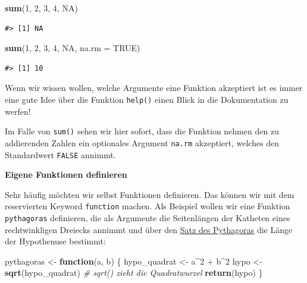 \documentclass[]{tufte-book}
\newenvironment{Shaded}{}{}
\newcommand{\KeywordTok}[1]{\textcolor[rgb]{0.00,0.44,0.13}{\textbf{#1}}}
\newcommand{\DataTypeTok}[1]{\textcolor[rgb]{0.56,0.13,0.00}{#1}}
\newcommand{\DecValTok}[1]{\textcolor[rgb]{0.25,0.63,0.44}{#1}}
\newcommand{\StringTok}[1]{\textcolor[rgb]{0.25,0.44,0.63}{#1}}
\newcommand{\CommentTok}[1]{\textcolor[rgb]{0.38,0.63,0.69}{\textit{#1}}}
\newcommand{\OtherTok}[1]{\textcolor[rgb]{0.00,0.44,0.13}{#1}}
\newcommand{\ControlFlowTok}[1]{\textcolor[rgb]{0.00,0.44,0.13}{\textbf{#1}}}
\newcommand{\OperatorTok}[1]{\textcolor[rgb]{0.40,0.40,0.40}{#1}}
\newcommand{\NormalTok}[1]{#1}
\begin{document}
\begin{Shaded}
\begin{Highlighting}[]
\KeywordTok{sum}\NormalTok{(}\DecValTok{1}\NormalTok{, }\DecValTok{2}\NormalTok{, }\DecValTok{3}\NormalTok{, }\DecValTok{4}\NormalTok{, }\OtherTok{NA}\NormalTok{)}
\end{Highlighting}
\end{Shaded}

\begin{verbatim}
#> [1] NA
\end{verbatim}

\begin{Shaded}
\begin{Highlighting}[]
\KeywordTok{sum}\NormalTok{(}\DecValTok{1}\NormalTok{, }\DecValTok{2}\NormalTok{, }\DecValTok{3}\NormalTok{, }\DecValTok{4}\NormalTok{, }\OtherTok{NA}\NormalTok{, }\DataTypeTok{na.rm =} \OtherTok{TRUE}\NormalTok{)}
\end{Highlighting}
\end{Shaded}

\begin{verbatim}
#> [1] 10
\end{verbatim}

Wenn wir wissen wollen, welche Argumente eine Funktion akzeptiert ist es
immer eine gute Idee über die Funktion \texttt{help()} einen Blick in
die Dokumentation zu werfen!

Im Falle von \texttt{sum()} sehen wir hier sofort, dass die Funktion
nehmen den zu addierenden Zahlen ein optionales Argument \texttt{na.rm}
akzeptiert, welches den Standardwert \texttt{FALSE} annimmt.

\textbf{Eigene Funktionen definieren}

Sehr häufig möchten wir selbst Funktionen definieren. Das können wir mit
dem reservierten Keyword \texttt{function} machen. Als Beispiel wollen
wir eine Funktion \texttt{pythagoras} definieren, die als Argumente die
Seitenlängen der Katheten eines rechtwinkligen Dreiecks annimmt und über
den \href{https://de.wikipedia.org/wiki/Satz_des_Pythagoras}{Satz des
Pythagoras} die Länge der Hypothenuse bestimmt:

\begin{Shaded}
\begin{Highlighting}[]
\NormalTok{pythagoras <-}\StringTok{ }\ControlFlowTok{function}\NormalTok{(a, b) \{}
\NormalTok{    hypo_quadrat <-}\StringTok{ }\NormalTok{a}\OperatorTok{^}\DecValTok{2} \OperatorTok{+}\StringTok{ }\NormalTok{b}\OperatorTok{^}\DecValTok{2}
\NormalTok{    hypo <-}\StringTok{ }\KeywordTok{sqrt}\NormalTok{(hypo_quadrat)  }\CommentTok{# sqrt() zieht die Quadratwurzel}
    \KeywordTok{return}\NormalTok{(hypo)}
\NormalTok{\}}
\end{Highlighting}
\end{Shaded}
\end{document}
